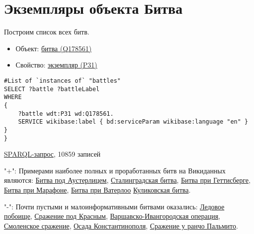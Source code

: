 \section{Экземпляры объекта Битва}
\href{http://}{}
Построим список всех битв.

\begin{itemize}
    \item Объект: \href{https://www.wikidata.org/wiki/Q178561}{битва (Q178561)}
    \item Свойство: \href{https://www.wikidata.org/wiki/Property:P31}{экземпляр (P31)}
\end{itemize}

\begin{lstlisting}[language=SPARQL]
#List of `instances of` "battles" 
SELECT ?battle ?battleLabel
WHERE
{
    ?battle wdt:P31 wd:Q178561.
    SERVICE wikibase:label { bd:serviceParam wikibase:language "en" }
}
}

\end{lstlisting}

\href{https://query.wikidata.org/#%23added%202017-02%0A%23List%20of%20%60instances%20of%60%20%22national%20park%22%20%0ASELECT%20%3Fbattle%20%3FbattleLabel%0AWHERE%0A%7B%0A%20%20%20%20%3Fbattle%20wdt%3AP31%20wd%3AQ178561.%0A%20%20%20%20SERVICE%20wikibase%3Alabel%20%7B%20bd%3AserviceParam%20wikibase%3Alanguage%20%22en%22%20%7D%0A%7D}{SPARQL-запрос}, 10859 записей

"+": Примерами наиболее полных и проработанных битв на Викиданных являются:
\href{https://www.wikidata.org/wiki/Q134114}{Битва под Аустерлицем}, 
\href{https://www.wikidata.org/wiki/Q38789}{Сталинградская битва},
\href{https://www.wikidata.org/wiki/Q33132}{Битва при Геттисберге},
\href{https://www.wikidata.org/wiki/Q31900}{Битва при Марафоне},
\href{https://www.wikidata.org/wiki/Q48314}{Битва при Ватерлоо}
\href{https://www.wikidata.org/wiki/Q210354}{Куликовская битва}.

"-": Почти пустыми и малоинформативными битвами оказались:
\href{https://www.wikidata.org/wiki/Q14689}{Ледовое побоище},
\href{https://www.wikidata.org/wiki/Q25809}{Сражение под Красным},
\href{https://www.wikidata.org/wiki/Q28205}{Варшавско-Ивангородская операция},
\href{https://www.wikidata.org/wiki/Q1071578}{Смоленское сражение},
\href{https://www.wikidata.org/wiki/Q27900}{Осада Константинополя},
\href{https://www.wikidata.org/wiki/Q48776}{Сражение у ранчо Пальмито}.
